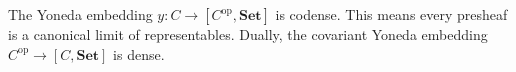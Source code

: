 The Yoneda embedding $y: C \to [C^{\mathrm{op}}, \mathbf{Set}]$ is codense. This means every presheaf is a canonical limit of representables. Dually, the covariant Yoneda embedding $C^{\mathrm{op}} \to [C, \mathbf{Set}]$ is dense.
